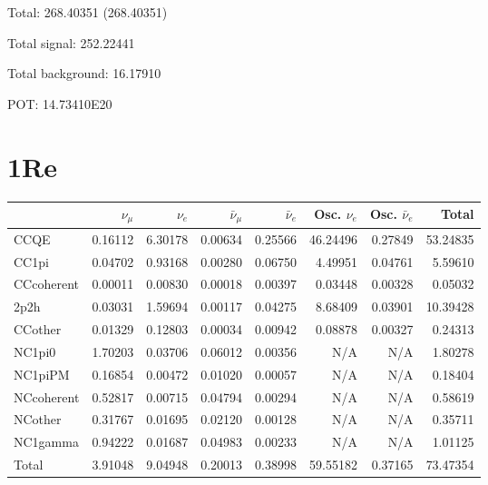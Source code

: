 \documentclass[10pt,a4paper]{article}
\begin{document}
Total: 268.40351    (268.40351)


Total signal: 252.22441


Total background: 16.17910

POT: 14.73410E20


\section*{1Re}
\begin{tabular} { | l ||r | r | r | r | r | r | | r | }
\hline
              & $\nu_\mu$            & $\nu_e$              & $\bar{\nu}_{\mu}$    & $\bar{\nu}_{e}$      & Osc. $\nu_e$         & Osc. $\bar{\nu}_{e}$ & Total                \\ \hline\hline
 CCQE         & 0.16112              & 6.30178              & 0.00634              & 0.25566              & 46.24496             & 0.27849              & 53.24835             \\ \hline
 CC1pi        & 0.04702              & 0.93168              & 0.00280              & 0.06750              & 4.49951              & 0.04761              & 5.59610              \\ \hline
 CCcoherent   & 0.00011              & 0.00830              & 0.00018              & 0.00397              & 0.03448              & 0.00328              & 0.05032              \\ \hline
 2p2h         & 0.03031              & 1.59694              & 0.00117              & 0.04275              & 8.68409              & 0.03901              & 10.39428             \\ \hline
 CCother      & 0.01329              & 0.12803              & 0.00034              & 0.00942              & 0.08878              & 0.00327              & 0.24313              \\ \hline
 NC1pi0       & 1.70203              & 0.03706              & 0.06012              & 0.00356              & N/A                  & N/A                  & 1.80278              \\ \hline
 NC1piPM      & 0.16854              & 0.00472              & 0.01020              & 0.00057              & N/A                  & N/A                  & 0.18404              \\ \hline
 NCcoherent   & 0.52817              & 0.00715              & 0.04794              & 0.00294              & N/A                  & N/A                  & 0.58619              \\ \hline
 NCother      & 0.31767              & 0.01695              & 0.02120              & 0.00128              & N/A                  & N/A                  & 0.35711              \\ \hline
 NC1gamma     & 0.94222              & 0.01687              & 0.04983              & 0.00233              & N/A                  & N/A                  & 1.01125              \\ \hline
\hline
 Total        & 3.91048              & 9.04948              & 0.20013              & 0.38998              & 59.55182             & 0.37165              & 73.47354             \\ \hline

\end{tabular}
\end{document}

